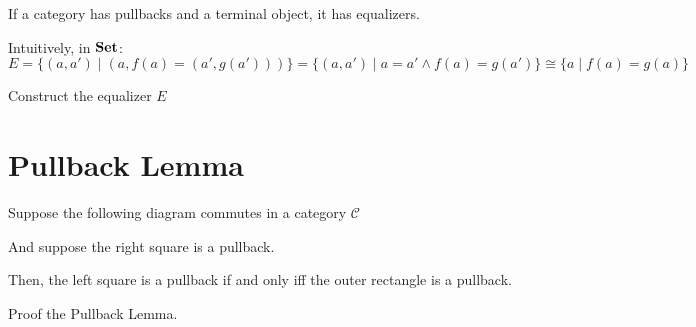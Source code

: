 \begin{lemma}

If a category has pullbacks and a terminal object, it has equalizers.

\begin{center}
\end{center}

\begin{center}
\end{center}

Intuitively, in $\mathbf {Set}$:
$$
  E
  =
  \big\{(a, a') \mid (a, f(a) = (a', g(a')))\big\}
  =
  \big\{(a, a') \mid a = a' \wedge f(a) = g(a')\big\}
  \cong
  \big\{a \mid f(a) = g(a)\big\}
$$

\end{lemma}

\begin{exercise}
Construct the equalizer $E$
\end{exercise}

\section{Pullback Lemma}
\begin{theorem}
Suppose the following diagram commutes in a category $\mathcal{C}$
\begin{center}
\end{center}
And suppose the right square is a pullback.

Then, the left square is a pullback if and only iff the outer rectangle is a pullback.
\end{theorem}
\begin{exercise}
	Proof the Pullback Lemma.
\end{exercise}

